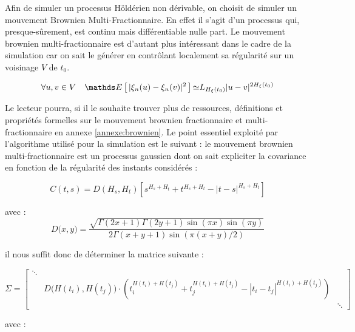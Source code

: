 Afin de simuler un processus Höldérien non dérivable, on choisit de simuler un mouvement Brownien Multi-Fractionnaire. En effet il s'agit d'un processus qui, presque-sûrement, est continu mais différentiable nulle part. Le mouvement brownien multi-fractionnaire est d'autant plus intéressant dans le cadre de la simulation car on sait le générer en contrôlant localement sa régularité sur un voisinage $V$ de $t_0$.

\begin{equation*}
	\forall u,v \in V \quad	\esperance{ | \xi_n(u) - \xi_n(v) |^2 } \mathbf{\simeq} L_{H_{\xi}(t_0) } |u - v|^{2 H_{\xi}(t_0)}
\end{equation*}

Le lecteur pourra, si il le souhaite trouver plus de ressources, définitions et propriétés formelles sur le mouvement brownien fractionnaire et multi-fractionnaire en annexe \ref{annexe:brownien}. Le point essentiel exploité par l'algorithme utilisé pour la simulation est le suivant : le mouvement brownien multi-fractionnaire est un processus gaussien dont on sait expliciter la covariance en fonction de la régularité des instants considérés :

$$
C(t,s) = D(H_{s},H_{t})\left[s^{H_{s}+H_{t}}+t^{H_{s}+H_{t}}-|t-s|^{H_{s}+H_{t}}\right]
$$

avec :
$$
D\bigl(x,y\bigr) = \frac{{\sqrt{\Gamma(2x+1)\Gamma(2y+1)\sin(\pi x)\sin(\pi y)}}}{2\Gamma(x+y+1)\sin(\pi(x+y)/2)}
$$

il nous suffit donc de déterminer la matrice suivante :

$$
\Sigma = \begin{bmatrix}
	\ddots & & 
	\\
	& D\bigl(H(t_i), H(t_j) \bigr)\cdot( t_i^{H(t_i) + H(t_j)} + t_j^{H(t_i) + H(t_j)} - |t_i-t_j|^{H(t_i) + H(t_j)} ) &
	\\
	&& \ddots
\end{bmatrix}
$$

avec : 

